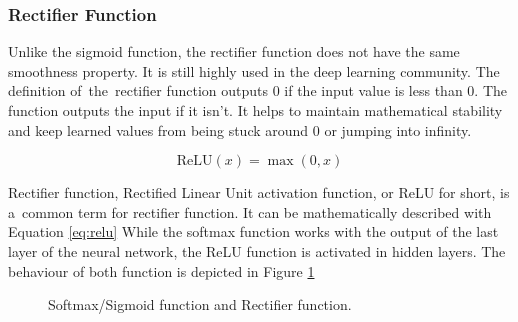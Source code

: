 \subsubsection*{Rectifier 
	Function}
Unlike the sigmoid function, the rectifier function does not have the same smoothness property. It is still highly used in the deep learning community. The definition of~the~rectifier function outputs 0 if the input value is less than 0. The function outputs the input if it isn't. It helps to maintain mathematical stability and keep learned values from being stuck around 0 or jumping into infinity.


\begin{equation}
	\text{ReLU}(x) = \max(0, x)
	\label{eq:relu}
\end{equation}

Rectifier function, Rectified Linear Unit activation function, or ReLU for short, is a~common term for rectifier function. It can be mathematically described with Equation \ref{eq:relu}\newline
While the softmax function works with the output of the last layer of the neural network, the ReLU function is activated in hidden layers. The behaviour of both function is depicted in Figure \ref{fig:foftmaxrelu} 
\begin{figure}[h]
	\centering
	\begin{minipage}{.5\textwidth}
		\centering
	\end{minipage}%
	\begin{minipage}{.5\textwidth}
		\centering
		
	\end{minipage}
	\caption{Softmax/Sigmoid function and Rectifier function.}
	\label{fig:foftmaxrelu}
\end{figure}

